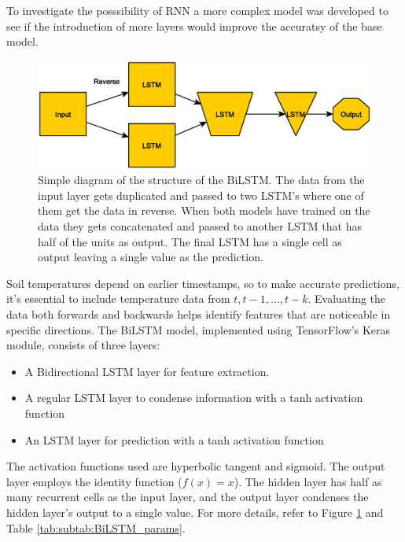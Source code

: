 To investigate the posssibility of RNN a more complex model was developed to see if the introduction of more layers would improve the accuratsy of the base model. 

\begin{figure}[H]
	\centering
	\includegraphics[width=0.7\linewidth]{figures/BiLSTM}
	\caption[modified BiLSTM overview]{Simple diagram of the structure of the BiLSTM. The data from the input layer gets duplicated and passed to two LSTM's where one of them get the data in reverse. When both models have trained on the data they gets concatenated and passed to another LSTM that has half of the units as output. The final LSTM has a single cell as output leaving a single value as the prediction.}
	\label{fig:bilstm}
\end{figure}

Soil temperatures depend on earlier timestamps, so to make accurate predictions, it's essential to include temperature data from $t, t-1, \dots, t-k$. Evaluating the data both forwards and backwards helps identify features that are noticeable in specific directions. The BiLSTM model, implemented using TensorFlow's Keras module, consists of three layers:

\begin{itemize}
	\item A Bidirectional LSTM layer for feature extraction.
	\item A regular LSTM layer to condense information with a tanh activation function
	\item An LSTM layer for prediction with a tanh activation function
\end{itemize}

The activation functions used are hyperbolic tangent and sigmoid. The output layer employs the identity function ($f(x) = x$). The hidden layer has half as many recurrent cells as the input layer, and the output layer condenses the hidden layer's output to a single value. For more details, refer to Figure \ref{fig:bilstm} and Table \ref{tab:subtab:BiLSTM_params}.

